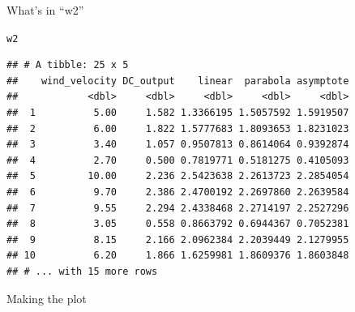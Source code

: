 \documentclass[unknownkeysallowed]{beamer}\usepackage[]{graphicx}\usepackage[]{color}
\makeatletter
\newcommand{\hlopt}[1]{\textcolor[rgb]{0,0,0}{#1}}%
\newcommand{\hlstd}[1]{\textcolor[rgb]{0.345,0.345,0.345}{#1}}%
\newcommand{\hlkwb}[1]{\textcolor[rgb]{0.69,0.353,0.396}{#1}}%
\newcommand{\hlkwc}[1]{\textcolor[rgb]{0.333,0.667,0.333}{#1}}%
\newcommand{\hlkwd}[1]{\textcolor[rgb]{0.737,0.353,0.396}{\textbf{#1}}}%
\newenvironment{kframe}{%
 \def\at@end@of@kframe{}%
 \ifinner\ifhmode%
  \def\at@end@of@kframe{\end{minipage}}%
  \begin{minipage}{\columnwidth}%
 \fi\fi%
 \def\FrameCommand##1{\hskip\@totalleftmargin \hskip-\fboxsep
 \colorbox{shadecolor}{##1}\hskip-\fboxsep
     \hskip-\linewidth \hskip-\@totalleftmargin \hskip\columnwidth}%
 \MakeFramed {\advance\hsize-\width
   \@totalleftmargin\z@ \linewidth\hsize
   \@setminipage}}%
 {\par\unskip\endMakeFramed%
 \at@end@of@kframe}
\newenvironment{knitrout}{}{} %
\makeatother
\begin{document}
\begin{frame}[fragile]{What's in ``w2''}
  
\begin{knitrout}
\color{fgcolor}\begin{kframe}
\begin{alltt}
\hlstd{w2}
\end{alltt}
\begin{verbatim}
## # A tibble: 25 x 5
##    wind_velocity DC_output    linear  parabola asymptote
##            <dbl>     <dbl>     <dbl>     <dbl>     <dbl>
##  1          5.00     1.582 1.3366195 1.5057592 1.5919507
##  2          6.00     1.822 1.5777683 1.8093653 1.8231023
##  3          3.40     1.057 0.9507813 0.8614064 0.9392874
##  4          2.70     0.500 0.7819771 0.5181275 0.4105093
##  5         10.00     2.236 2.5423638 2.2613723 2.2854054
##  6          9.70     2.386 2.4700192 2.2697860 2.2639584
##  7          9.55     2.294 2.4338468 2.2714197 2.2527296
##  8          3.05     0.558 0.8663792 0.6944367 0.7052381
##  9          8.15     2.166 2.0962384 2.2039449 2.1279955
## 10          6.20     1.866 1.6259981 1.8609376 1.8603848
## # ... with 15 more rows
\end{verbatim}
\end{kframe}
\end{knitrout}
  
\end{frame}

\begin{frame}[fragile]{Making the plot}
  
  
\end{frame}
\end{document}
